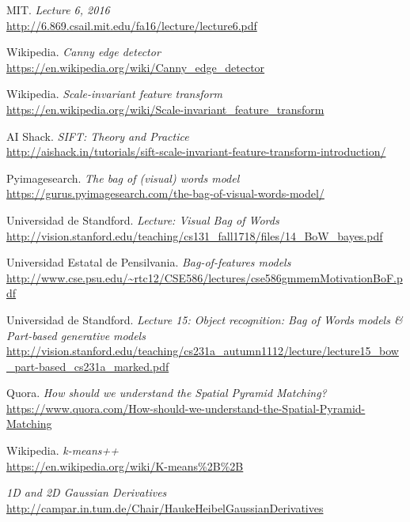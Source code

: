\documentclass[11pt,a4paper]{article}
\begin{document}
\begin{thebibliography}{20}
MIT. \textit{Lecture 6, 2016}
\\\url{http://6.869.csail.mit.edu/fa16/lecture/lecture6.pdf}

Wikipedia. \textit{Canny edge detector}
\\\url{https://en.wikipedia.org/wiki/Canny_edge_detector}

Wikipedia. \textit{Scale-invariant feature transform}
\\\url{https://en.wikipedia.org/wiki/Scale-invariant_feature_transform}

AI Shack. \textit{SIFT: Theory and Practice}
\\\url{http://aishack.in/tutorials/sift-scale-invariant-feature-transform-introduction/}

Pyimagesearch. \textit{The bag of (visual) words model}
\\\url{https://gurus.pyimagesearch.com/the-bag-of-visual-words-model/}

Universidad de Standford. \textit{Lecture: Visual Bag of Words}
\\\url{http://vision.stanford.edu/teaching/cs131_fall1718/files/14_BoW_bayes.pdf}

Universidad Estatal de Pensilvania. \textit{Bag-of-features models}
\\\url{http://www.cse.psu.edu/~rtc12/CSE586/lectures/cse586gmmemMotivationBoF.pdf}

Universidad de Standford. \textit{Lecture 15: Object recognition: Bag of Words models \& Part-based generative models}
\\\url{http://vision.stanford.edu/teaching/cs231a_autumn1112/lecture/lecture15_bow_part-based_cs231a_marked.pdf}

Quora. \textit{How should we understand the Spatial Pyramid Matching?}
\\\url{https://www.quora.com/How-should-we-understand-the-Spatial-Pyramid-Matching}

Wikipedia. \textit{k-means++}
\\\url{https://en.wikipedia.org/wiki/K-means%2B%2B}

\textit{1D and 2D Gaussian Derivatives}
\\\url{http://campar.in.tum.de/Chair/HaukeHeibelGaussianDerivatives}


\end{thebibliography}
\end{document}
